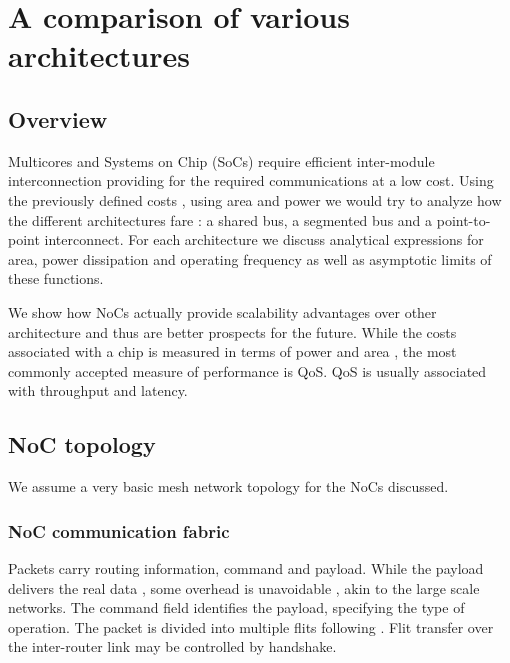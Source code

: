 
\lhead[\chaptername~\thechapter]{\rightmark}


\rhead[\leftmark]{}


\lfoot[\thepage]{}


\cfoot{}


\rfoot[]{\thepage}


\chapter{A comparison of various architectures}


\section{Overview}

Multicores and Systems on Chip (SoCs) require efficient inter-module
interconnection providing for the required communications at a low
cost. Using the previously defined costs , using area and power we
would try to analyze how the different architectures fare : a shared
bus, a segmented bus and a point-to-point interconnect. For each architecture
we discuss analytical expressions for area, power dissipation and
operating frequency as well as asymptotic limits of these functions. 

We show how NoCs actually provide scalability advantages over other
architecture and thus are better prospects for the future. While the
costs associated with a chip is measured in terms of power and area
, the most commonly accepted measure of performance is QoS. QoS is
usually associated with throughput and latency. 


\section{NoC topology}

We assume a very basic mesh network topology for the NoCs discussed.


\subsection{NoC communication fabric}

Packets carry routing information, command and payload. While the
payload delivers the real data , some overhead is unavoidable , akin
to the large scale networks. The command field identifies the payload,
specifying the type of operation. The packet is divided into multiple
flits following . Flit transfer over the inter-router link may be
controlled by handshake. 


